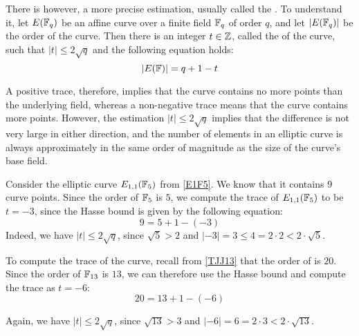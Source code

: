 There is however, a more precise estimation, usually called the . To understand it, let $E(\mathbb{F}_q)$ be an affine  curve over a finite field $\mathbb{F}_q$ of order $q$, and let $|E(\mathbb{F}_q)|$ be the order of the curve. Then there is an integer $t\in \mathbb{Z}$, called the  of the curve, such that $|t| \leq 2\sqrt{q}$ and the following equation holds:
\begin{equation}\label{hasse-bound}
|E(\mathbb{F})| = q +1 -t
\end{equation}

A positive trace, therefore, implies that the curve contains no more points than the underlying field, whereas a non-negative trace means that the curve contains more points. However, the estimation $|t| \leq 2\sqrt{q}$ implies that the difference is not very large in either direction, and the number of elements in an elliptic curve is always approximately in the same order of magnitude as the size of the curve's base field.

\begin{example}\label{ex:E1F5-frobenius} Consider the elliptic curve $E_{1,1}(\mathbb{F}_5)$ from \examplename{} \ref{E1F5}. We know that it contains $9$ curve points. Since the order of $\mathbb{F}_5$ is $5$, we compute the trace of $E_{1,1}(\mathbb{F}_5)$ to be $t=-3$, since the Hasse bound is given by the following equation:
$$
9 = 5 + 1 - (-3)
$$
Indeed, we have $|t| \leq 2\sqrt{q}$, since $\sqrt{5}> 2$ and 
$|-3|= 3 \leq 4 = 2\cdot 2< 2\cdot \sqrt{5}$.
\end{example}

\begin{example}\label{ex:TJJ13-frobenius} To compute the trace of the  curve, recall from \examplename{} \ref{TJJ13} that the order of \TJJ{} is $20$. Since the order of $\mathbb{F}_{13}$ is $13$, we can therefore use the Hasse bound and compute the trace as $t=-6$:
\begin{equation}
20 = 13 + 1 - (-6)
\end{equation}

Again, we have $|t| \leq 2\sqrt{q}$, since $\sqrt{13}> 3$ and 
$|-6|= 6 = 2\cdot 3< 2\cdot \sqrt{13}$.
\end{example}

